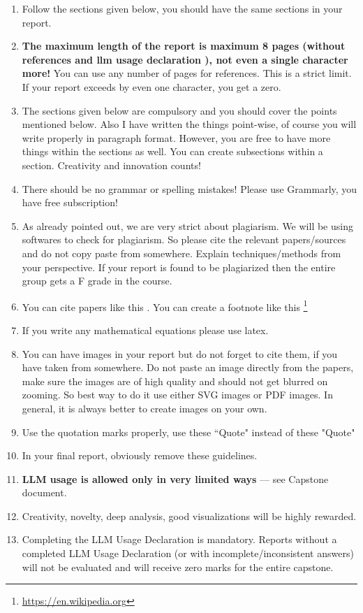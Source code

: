 \documentclass[11pt, oneside]{article}   	%
\begin{document}
\begin{enumerate}
\item Follow the sections given below, you should have the same sections in your report.
\item \textbf{The maximum length of the report is maximum 8 pages (without references and llm usage declaration ), not even a single character more!} You can use any number of pages for references. This is a strict limit. If your report exceeds by even one character, you get a zero.
\item The sections given below are compulsory and you should cover the points mentioned below. Also I have written the things point-wise, of course you will write properly in paragraph format. However, you are free to have more things within the sections as well. You can create subsections within a section.  Creativity and innovation counts! 
\item There should be no grammar or spelling mistakes! Please use Grammarly, you have free subscription! 
\item As already pointed out, we are very strict about plagiarism. We will be using softwares to check for plagiarism. So please cite the relevant papers/sources and do not copy paste from somewhere. Explain techniques/methods from your perspective. If your report is found to be plagiarized then the entire group gets a F grade in the course.  
\item You can cite papers like this \cite{sepehr:AAMAS2019, colombo:NAACL2019}. You can create a footnote like this \footnote{\url{https://en.wikipedia.org}} 
\item If you write any mathematical equations please use latex. 
\item You can have images in your report but do not forget to cite them, if you have taken from somewhere. Do not paste an image directly from the papers, make sure the images are of high quality and should not get blurred on zooming. So best way to do it use either SVG images or PDF images. In general, it is always better to create images on your own. 
\item Use the quotation marks properly, use these ``Quote" instead of these "Quote"
\item In your final report, obviously remove these guidelines. 
\item \textbf{LLM usage is allowed only in very limited ways} — see Capstone document.
\item Creativity, novelty, deep analysis, good visualizations will be highly rewarded.

\item Completing the LLM Usage Declaration is mandatory. Reports without a completed LLM Usage Declaration (or with incomplete/inconsistent answers) will not be evaluated and will receive zero marks for the entire capstone.  

\end{enumerate}
\end{document}

